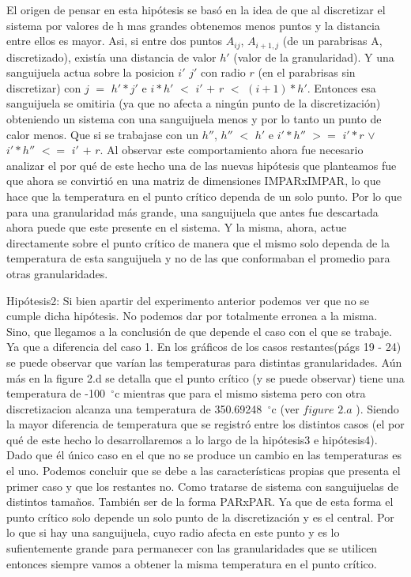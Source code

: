 El origen de pensar en esta hipótesis se basó en la idea de que al discretizar el sistema por valores de h mas grandes obtenemos menos puntos y la distancia entre ellos es mayor. Asi, si entre dos puntos $A_{ij}$, $A_{i+1,j}$ (de un parabrisas A, discretizado), existía una distancia de valor $h'$ (valor de la granularidad). Y una sanguijuela actua sobre la posicion $i'$ $j'$ con radio $r$ (en el parabrisas sin discretizar) con $j$ $=$ $h'*j'$ e $i*h'$ $<$ $i'$ $+$ $r$ $<$ $(i+1)*h'$. Entonces esa sanguijuela se omitiria (ya que no afecta a ningún punto de la discretización) obteniendo un sistema con una sanguijuela menos y por lo tanto un punto de calor menos. Que si se trabajase con un $h''$, $h''$ $<$ $h'$ e $i'*h''$ $>=$ $i'*r$ $\vee$ $i'*h''$ $<=$ $i'$ $+$ $r$. Al observar este comportamiento ahora fue necesario analizar el por qué de este hecho una de las nuevas hipótesis que planteamos fue que ahora se convirtió en una matriz de dimensiones IMPARxIMPAR, lo que hace que la temperatura en el punto crítico dependa de un solo punto. Por lo que para una granularidad más grande, una sanguijuela que antes fue descartada ahora puede que este presente en el sistema. Y la misma, ahora, actue directamente sobre el punto crítico de manera que el mismo solo dependa de la temperatura de esta sanguijuela y no de las que conformaban el promedio para otras granularidades.\newline \newline

Hipótesis2: Si bien apartir del experimento anterior podemos ver que no se cumple dicha hipótesis. No podemos dar por totalmente erronea a la misma. Sino, que llegamos a la conclusión de que depende el caso con el que se trabaje. Ya que a diferencia del caso 1. En los gráficos de los casos restantes(págs 19 - 24) se puede observar que varían las temperaturas para distintas granularidades. Aún más en la figure 2.d se detalla que el punto crítico (y se puede observar) tiene una temperatura de -100\hspace{-1.5mm}$\phantom{a}^{\circ}$c mientras que para el mismo sistema pero con otra discretizacion alcanza una temperatura de  350.69248\hspace{-1.5mm}$\phantom{a}^{\circ}$c (ver $figure$ $2.a$ ). Siendo la mayor diferencia de temperatura que se registró entre los distintos casos (el por qué de este hecho lo desarrollaremos a lo largo de la hipótesis3 e hipótesis4). Dado que él único caso en el que no se produce un cambio en las temperaturas es el uno. Podemos concluir que se debe a las características propias que presenta el primer caso y que los restantes no. Como tratarse de sistema con sanguijuelas de distintos tamaños. También ser de la forma PARxPAR. Ya que de esta forma el punto crítico solo depende un solo punto de la discretización y es el central. Por lo que si hay una sanguijuela, cuyo radio afecta en este punto y es lo sufientemente grande para permanecer con las granularidades que se utilicen entonces siempre vamos a obtener la misma temperatura en el punto crítico. \newline \newline


